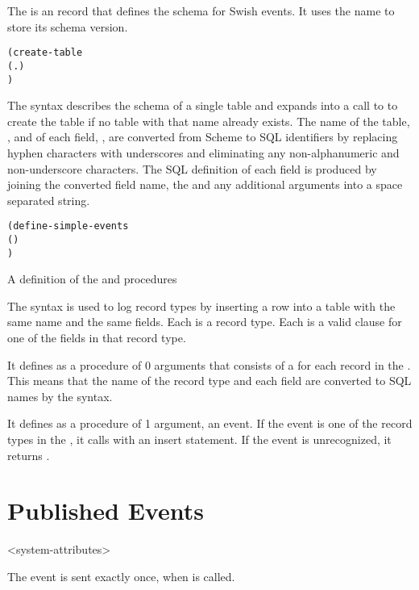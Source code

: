 The  is an  record
that defines the schema for Swish events. It uses the name
 to store its schema version.

\begin{syntax}\begin{alltt}
(create-table 
  (  . )
  \etc{})\strut\end{alltt}
\end{syntax}
\expandsto{} 

The  syntax describes the schema of a single
table and expands into a call to  to create the table
if no table with that name already exists. The name of the table,
, and of each field, , are converted from Scheme
to SQL identifiers by replacing hyphen characters with underscores and
eliminating any non-alphanumeric and non-underscore characters. The
SQL definition of each field is produced by joining the converted
field name, the  and any additional  arguments
into a space separated string.

\begin{syntax}\begin{alltt}
(define-simple-events  
  (  \etc{})
  \etc{})\strut\end{alltt}
\end{syntax}
\expandsto{} A definition of the  and 
procedures

The  syntax is used to log record types
by inserting a row into a table with the same name and the same
fields. Each  is a record type. Each  is a valid
 clause for one of the fields in that record
type.

It defines  as a procedure of 0 arguments that consists of
a  for each
record in the . This means that the name
of the record type and each field are converted to SQL names by the
 syntax.

It defines  as a procedure of 1 argument, an event. If the
event is one of the record types in the ,
it calls  with an insert statement. If the event is
unrecognized, it returns .

\section {Published Events}

\begin{pubevent}{<system-attributes>}
\end{pubevent}

The  event is sent exactly once, when
 is called.
